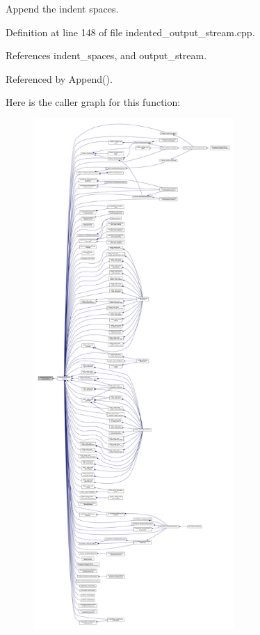 Append the indent spaces. 



Definition at line 148 of file indented\+\_\+output\+\_\+stream.\+cpp.



References indent\+\_\+spaces, and output\+\_\+stream.



Referenced by Append().

Here is the caller graph for this function\+:
\nopagebreak
\begin{figure}[H]
\begin{center}
\leavevmode
\includegraphics[height=550pt]{d4/d62/classIndentedOutputStream_adeb5dd8a59cf3f5b24809212f6cc286d_icgraph}
\end{center}
\end{figure}
\mbox{\label{classIndentedOutputStream_a0f85e6d203422d7f1c690a3e8a1366fa}} 
